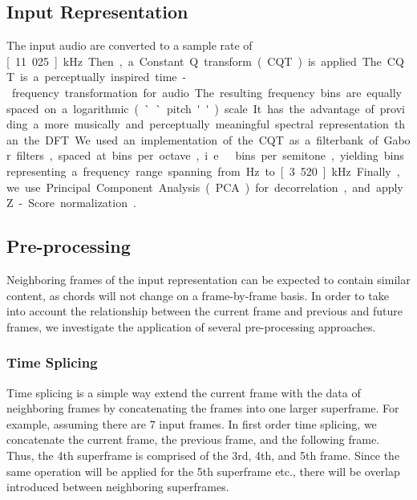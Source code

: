 \documentclass{article}
\begin{document}
\subsection{Input Representation}\label{sec:input}
The input audio are converted to a sample rate of \unit[11.025]{kHz}. Then, a Constant Q transform (CQT) is applied. 
The CQT is a perceptually inspired time-frequency transformation for audio. The resulting frequency bins are equally spaced on a logarithmic (``pitch'') scale. It has the advantage of providing a more musically and perceptually meaningful spectral representation than the DFT. 
We used an implementation of the CQT as a filterbank of Gabor filters, spaced at \unit[36]{bins per octave}, i.e.\ \unit[3]{bins per semitone}, yielding \unit[180]{bins} representing a frequency range spanning from \unit[110]{Hz} to \unit[3.520]{kHz}. Finally, we use Principal Component Analysis (PCA) for decorrelation, and apply Z-Score normalization\cite{sola1997importance}. 

\subsection{Pre-processing}\label{sec:pre-proc}
Neighboring frames of the input representation can be expected to contain similar content, as chords will not change on a frame-by-frame basis. In order to take into account the relationship between the current frame and previous and future frames, we investigate the application of several pre-processing approaches.

\subsubsection{Time Splicing}
Time splicing is a simple way extend the current frame with the data of neighboring frames by concatenating the frames into one larger superframe. For example, assuming there are 7 input frames. In first order time splicing, we concatenate the current frame, the previous frame, and the following frame. Thus, the 4th superframe is comprised of the 3rd, 4th, and 5th frame. Since the same operation will be applied for the 5th superframe etc., there will be overlap introduced between neighboring superframes. %
\end{document}
